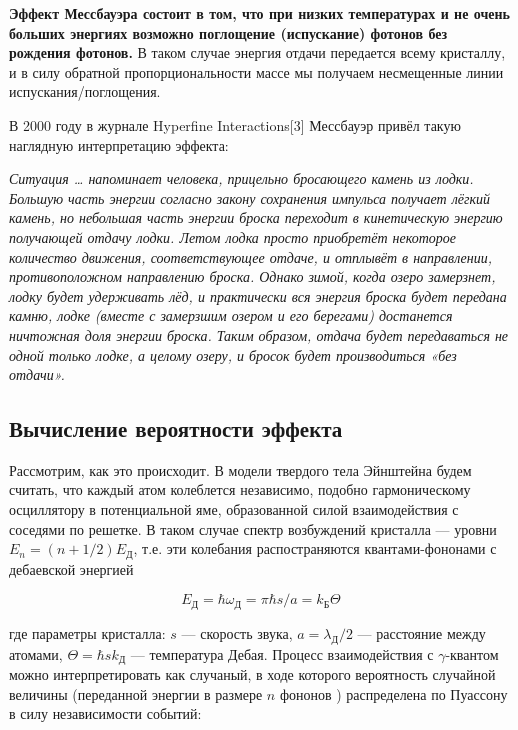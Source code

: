 \documentclass[12pt]{kiarticle}
\newcommand{\ga}{\ensuremath{\gamma}}
\begin{document}
\textbf{Эффект Мессбауэра состоит в том, что при низких температурах и не очень больших энергиях возможно поглощение (испускание) фотонов без рождения фотонов.} В таком случае энергия отдачи передается всему кристаллу, и в силу обратной пропорциональности массе мы получаем несмещенные линии испускания/поглощения.

В 2000 году в журнале Hyperfine Interactions[3] Мессбауэр привёл такую наглядную интерпретацию эффекта:

\begin{displayquote}
	\textit{Ситуация … напоминает человека, прицельно бросающего камень из лодки. Большую часть энергии согласно закону сохранения импульса получает лёгкий камень, но небольшая часть энергии броска переходит в кинетическую энергию получающей отдачу лодки. Летом лодка просто приобретёт некоторое количество движения, соответствующее отдаче, и отплывёт в направлении, противоположном направлению броска. Однако зимой, когда озеро замерзнет, лодку будет удерживать лёд, и практически вся энергия броска будет передана камню, лодке (вместе с замерзшим озером и его берегами) достанется ничтожная доля энергии броска. Таким образом, отдача будет передаваться не одной только лодке, а целому озеру, и бросок будет производиться «без отдачи».}
\end{displayquote} 

\subsection{Вычисление вероятности эффекта}

Рассмотрим, как это происходит. В модели твердого тела Эйнштейна будем считать, что каждый атом колеблется независимо, подобно гармоническому осциллятору в потенциальной яме, образованной силой взаимодействия с соседями по решетке. В таком случае спектр возбуждений кристалла --- уровни $ E_n = (n + 1/2) E_Д $, т.е. эти колебания распостраняются квантами-фононами с дебаевской энергией 

\begin{equation}\label{}
E_Д = \hbar \omega_Д = \pi \hbar s / a = k_Б \Theta
\end{equation} 

где параметры кристалла: $ s $ --- скорость звука, $ a = \lambda_Д/2 $ --- расстояние между атомами, $ \Theta = \hbar s k_Д $ --- температура Дебая. Процесс взаимодействия с \ga-квантом можно интерпретировать как случаный, в ходе которого вероятность случайной величины (переданной энергии в размере $ n $ фононов ) распределена по Пуассону в силу независимости событий:
\end{document}
